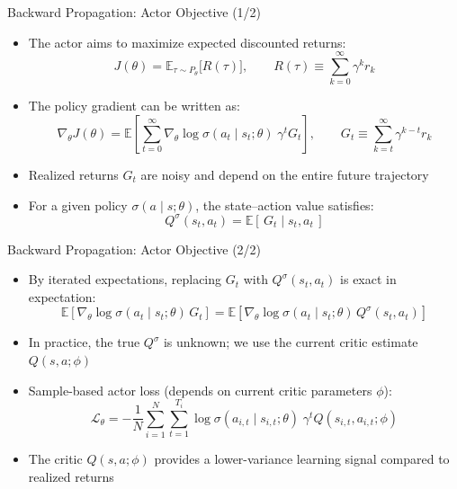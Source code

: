 \documentclass[aspectratio=169]{beamer}
\newcommand{\1}{\mathbf{1}}
\begin{document}
  \begin{frame}{Backward Propagation: Actor Objective (1/2)}
    \small
    \begin{itemize}
        \item The actor aims to maximize expected discounted returns:
        \[
            J(\theta)
            =
            \mathbb{E}_{\tau \sim P_\theta}
            \big[ R(\tau) \big],
            \qquad
            R(\tau) \equiv \sum_{k=0}^{\infty} \gamma^k r_k
        \]
    
        \item The policy gradient can be written as:
        \[
            \nabla_\theta J(\theta)
            =
            \mathbb{E}
            \left[
                \sum_{t=0}^{\infty}
                \nabla_\theta \log \sigma(a_t \mid s_t;\theta)\;
                \gamma^t G_t
            \right],
            \qquad
            G_t \equiv \sum_{k=t}^{\infty} \gamma^{k-t} r_k
        \]
    
        \item Realized returns $G_t$ are noisy and depend on the entire future trajectory
    
        \item For a given policy $\sigma(a \mid s;\theta)$, the state--action value satisfies:
        \[
            Q^\sigma(s_t,a_t)
            =
            \mathbb{E}[\,G_t \mid s_t, a_t\,]
        \]
    \end{itemize}
\end{frame}

\begin{frame}{Backward Propagation: Actor Objective (2/2)}
    \small
    \begin{itemize}
        \item By iterated expectations, replacing $G_t$ with $Q^\sigma(s_t,a_t)$ is exact in expectation:
        \[
            \mathbb{E}\!\left[
            \nabla_\theta \log \sigma(a_t \mid s_t;\theta)\, G_t
            \right]
            =
            \mathbb{E}\!\left[
            \nabla_\theta \log \sigma(a_t \mid s_t;\theta)\, Q^\sigma(s_t,a_t)
            \right]
        \]
    
        \item In practice, the true $Q^\sigma$ is unknown; we use the current critic estimate $Q(s,a;\phi)$
    
        \item Sample-based actor loss (depends on current critic parameters $\phi$):
        \[
            \mathcal{L}_\theta
            =
            -\frac{1}{N}
            \sum_{i=1}^{N}
            \sum_{t=1}^{T_i}
            \log \sigma(a_{i,t} \mid s_{i,t};\theta)\;
            \gamma^t Q(s_{i,t},a_{i,t};\phi)
        \]

        \item The critic $Q(s,a;\phi)$ provides a lower-variance learning signal compared to realized returns
    \end{itemize}
\end{frame}
\end{document}
